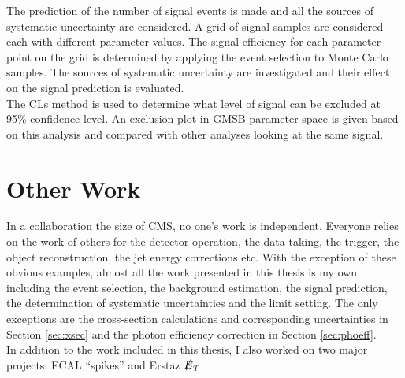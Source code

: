 The prediction of the number of signal events is made and all the sources of
systematic uncertainty are considered. A grid of signal samples are considered
each with different parameter values. The signal efficiency for each parameter
point on the grid is determined by applying the event selection to Monte Carlo 
samples. The sources of systematic uncertainty are investigated and their effect
on the signal prediction is evaluated. \\

The CLs method \cite{cls} is used to determine what level of signal can be 
excluded at 95\% confidence level. An exclusion plot in GMSB parameter space is 
given based on this analysis and compared with other analyses looking at the 
same signal.

\section{Other Work}

In a collaboration the size of CMS, no one's work is independent. Everyone
relies on the work of others for the detector operation, the data taking, the
trigger, the object reconstruction, the jet energy corrections etc. With the
exception of these obvious examples, almost all the work presented in this 
thesis is my own including the event selection, the background estimation, the
signal prediction, the determination of systematic uncertainties and the limit
setting. The only exceptions are the cross-section calculations and 
corresponding uncertainties in Section \ref{sec:xsec} and the photon efficiency
correction in Section \ref{sec:phoeff}. \\

In addition to the work included in this thesis, I also worked on two major
projects: ECAL ``spikes'' and Erstaz $\slashed{E}_{T}$. 


